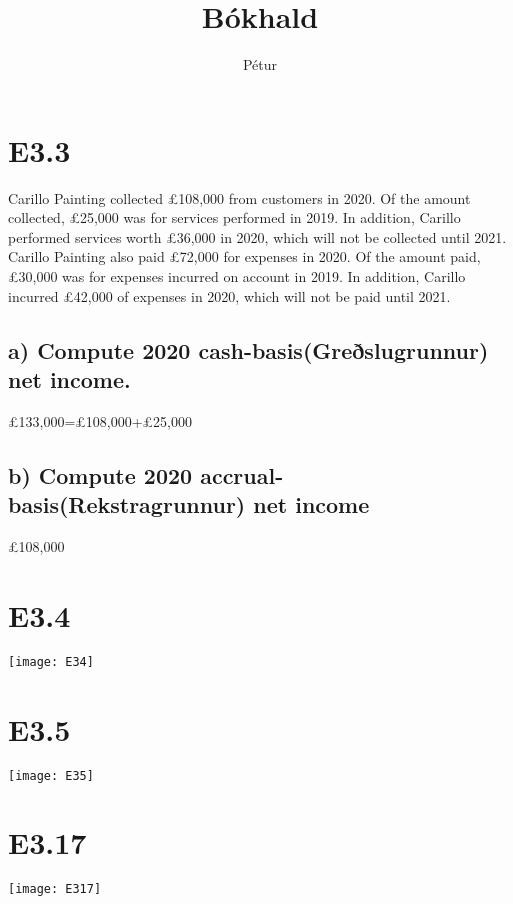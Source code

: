 \documentclass[]{article}
\begin{document}
\title{Bókhald}
\author{Pétur}
\maketitle

\section*{E3.3}

Carillo Painting collected £108,000 from customers in 2020. Of the amount collected, £25,000 was for services performed in 2019. In addition, Carillo performed services worth £36,000 in 2020, which will not be collected until 2021.\\ 
Carillo Painting also paid £72,000 for expenses in 2020. Of the amount paid, £30,000 was for expenses incurred on account in 2019. In addition, Carillo incurred £42,000 of expenses in 2020, which will not be paid until 2021. 
\subsection*{a) Compute 2020 cash-basis(Greðslugrunnur) net income.}
£133,000=£108,000+£25,000
\subsection*{b) Compute 2020 accrual-basis(Rekstragrunnur) net income}
£108,000

\section*{E3.4}
\texttt{[image: E34]}

\section*{E3.5}
\texttt{[image: E35]}

\section*{E3.17}
\texttt{[image: E317]}
\end{document}
